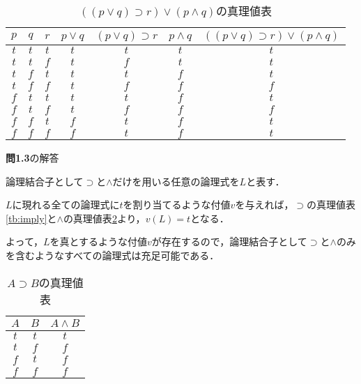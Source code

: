 \documentclass[11pt,dvipdfmx]{jreport}
\begin{document}
\begin{table}[!htbp]
  \centering
  \caption{$((p \lor q) \supset r) \lor (p \land q)$の真理値表}
  \vspace{3mm}
  \begin{tabular}{c|c|c|c|c|c|c}
    $p$ & $q$ & $r$ & $p \lor q$ & $(p \lor q) \supset r$ & $p \land q$ & $((p \lor q) \supset r) \lor (p \land q)$ \\ \hline
    $t$ & $t$ & $t$ & $t$ & $t$ & $t$ & $t$ \\ \hline  %
    $t$ & $t$ & $f$ & $t$ & $f$ & $t$ & $t$ \\ \hline  %
    $t$ & $f$ & $t$ & $t$ & $t$ & $f$ & $t$ \\ \hline  %
    $t$ & $f$ & $f$ & $t$ & $f$ & $f$ & $f$ \\ \hline  %
    $f$ & $t$ & $t$ & $t$ & $t$ & $f$ & $t$ \\ \hline  %
    $f$ & $t$ & $f$ & $t$ & $f$ & $f$ & $f$ \\ \hline  %
    $f$ & $f$ & $t$ & $f$ & $t$ & $f$ & $t$ \\ \hline  %
    $f$ & $f$ & $f$ & $f$ & $t$ & $f$ & $t$ \\         %
  \end{tabular}
  \label{tb:porq}
\end{table}

\newpage

\noindent \textbf{問1.3}の解答 \par 
\vspace{2mm}
論理結合子として$\supset$と$\land$だけを用いる任意の論理式を$L$と表す．
\par
$L$に現れる全ての論理式に$t$を割り当てるような付値$v$を与えれば，$\supset$の真理値表\ref{tb:imply}と$\land$の真理値表\ref{tb:and}より，$v(L) = t$となる．
\par
よって，$L$を真とするような付値$v$が存在するので，論理結合子として$\supset$と$\land$のみを含むようなすべての論理式は充足可能である．
\begin{table}[!htbp]
  \centering
  \caption{$A \supset B$の真理値表}
  \vspace{3mm}
  \begin{tabular}{c|c|c}
    $A$ & $B$ & $A \land B$ \\ \hline
    $t$ & $t$ & $t$ \\ \hline
    $t$ & $f$ & $f$ \\ \hline
    $f$ & $t$ & $f$ \\ \hline
    $f$ & $f$ & $f$ 
  \end{tabular}
  \label{tb:and}
\end{table}
\end{document}
